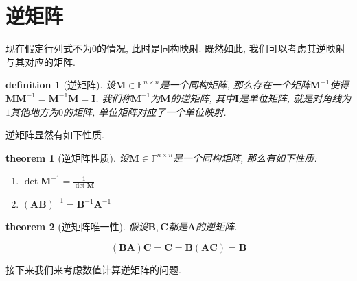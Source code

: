 \documentclass[12pt]{ctexbook}
\newtheorem{definition}{definition}
\numberwithin{definition}{section}
\newtheorem{theorem}{theorem}
\numberwithin{theorem}{section}
\numberwithin{exercise}{section}
\numberwithin{example}{section}
\numberwithin{lemma}{section}
\begin{document}
    \section{逆矩阵}

    现在假定行列式不为\(0\)的情况, 此时是同构映射. 既然如此, 我们可以考虑其逆映射与其对应的矩阵.

    \begin{definition}
        [逆矩阵] 设\(\mathbf{M} \in \mathbb{F}^{n \times n}\)是一个同构矩阵, 那么存在一个矩阵\(\mathbf{M}^{-1}\)使得\(\mathbf{M} \mathbf{M}^{-1} = \mathbf{M}^{-1} \mathbf{M} = \mathbf{I}\).
        我们称\(\mathbf{M}^{-1}\)为\(\mathbf{M}\)的逆矩阵, 其中\(\mathbf{I}\)是单位矩阵, 就是对角线为\(1\)其他地方为\(0\)的矩阵, 单位矩阵对应了一个单位映射.
    \end{definition}

    逆矩阵显然有如下性质.

    \begin{theorem}
        [逆矩阵性质] 设\(\mathbf{M} \in \mathbb{F}^{n \times n}\)是一个同构矩阵, 那么有如下性质:
        \begin{enumerate}
            \item \(\det \mathbf{M}^{-1} = \frac{1}{\det \mathbf{M}}\)
            \item \({(\mathbf{A}\mathbf{B})}^{-1} = \mathbf{B}^{-1} \mathbf{A}^{-1}\)
        \end{enumerate}
    \end{theorem}

    \begin{theorem}
        [逆矩阵唯一性] 假设\(\mathbf{B}, \mathbf{C}\)都是\(\mathbf{A}\)的逆矩阵.
        
        \begin{equation}
            (\mathbf{B} \mathbf{A}) \mathbf{C} = \mathbf{C} = \mathbf{B} (\mathbf{A} \mathbf{C}) = \mathbf{B}
        \end{equation}
    \end{theorem}
        
    接下来我们来考虑数值计算逆矩阵的问题.
\end{document}
